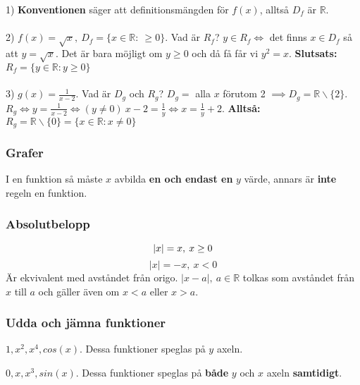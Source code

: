 \documentclass{report}
\begin{document}
{
1) \textbf{Konventionen} säger att definitionsmängden för $ f(x) $, alltså $ D_f $ är $ \mathbb{R} $.\\\\

2) $ f(x) = \sqrt{x},\:D_f = \{x \in \mathbb{R} :\: \ge 0\} $. Vad är $ R_f $? $ y \in R_f \iff $ det finns $ x \in D_f $ så att $ y = \sqrt{x}  $. Det är bara möjligt om $ y \ge 0 $ och då få får vi $ y^2 = x $. \textbf{Slutsats:} $ R_f = \{y \in \mathbb{R} : y \ge 0\} $\\\\

3) $ g(x) = \frac{1}{x-2} $. Vad är $ D_g $ och $ R_g $? $ D_g = $ alla $ x $ förutom 2 $ \implies D_g = \mathbb{R}\backslash \{2\}$.\\
$ R_g \iff y = \frac{1}{x-2} \iff (y \ne 0)\:x-2 = \frac{1}{y} \iff x = \frac{1}{y}+2 $. \textbf{Alltså:} $ R_g = \mathbb{R}\backslash \{0\} = \{x \in \mathbb{R} : x \ne 0\} $   
}

\subsubsection{Grafer}
I en funktion så måste $ x $ avbilda \textbf{en och endast en} $ y $ värde, annars är \textbf{inte} regeln en funktion. 

\subsubsection{Absolutbelopp}
{
\begin{equation*}
|x| = x,\:x \ge 0\\
\end{equation*}
\begin{equation*}
|x| = -x,\:x<0
\end{equation*}
Är ekvivalent med avståndet från origo. $ |x-a|,\:a \in \mathbb{R} $ tolkas som avståndet från $ x $ till $ a $ och gäller även om $ x < a $ eller $ x > a $.
}

\subsubsection{Udda och jämna funktioner}
{
	$ 1, x^2, x^4, cos(x) $. Dessa funktioner speglas på $ y $ axeln.  
}

{
	$ 0, x, x^3, sin(x) $. Dessa funktioner speglas på \textbf{både} $ y $ och $ x $ axeln \textbf{samtidigt}.   
}
\end{document}

